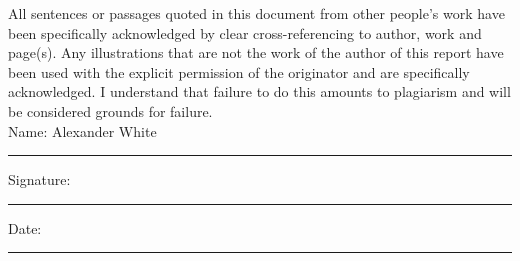 \documentclass[11pt,oneside]{book}
\begin{document}
All sentences or passages quoted in this document from other people's work have been specifically acknowledged by clear cross-referencing to author, work and page(s).  Any illustrations that are not the work of the author of this report have been used with the explicit permission of the originator and are specifically acknowledged.  I understand that failure to do this amounts to plagiarism and will be considered grounds for failure.\\[1cm]

\noindent Name: Alexander White\\[1mm]
\rule[1em]{25em}{0.5pt}

\noindent Signature:\\[1mm]
\rule[1em]{25em}{0.5pt}

\noindent Date:\\[1mm]
\rule[1em]{25em}{0.5pt}







\tableofcontents
\listoffigures
\listoftables



\mainmatter











 
 



\begin{appendices}


\end{appendices}
\end{document}
